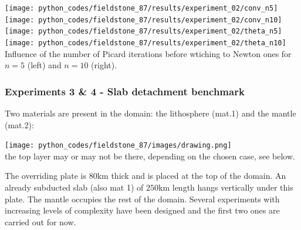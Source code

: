\begin{center}
\texttt{[image: python\_codes/fieldstone\_87/results/experiment\_02/conv\_n5]}
\texttt{[image: python\_codes/fieldstone\_87/results/experiment\_02/conv\_n10]}\\
\texttt{[image: python\_codes/fieldstone\_87/results/experiment\_02/theta\_n5]}
\texttt{[image: python\_codes/fieldstone\_87/results/experiment\_02/theta\_n10]}\\
{\captionfont Influence of the number of Picard iterations before wtiching to Newton ones
for $n=5$ (left) and $n=10$ (right).}
\end{center}





\newpage
\subsubsection*{Experiments 3 \& 4 - Slab detachment benchmark}

Two materials are present in the domain: the lithosphere (mat.1) and the mantle (mat.2):

\begin{center}
\texttt{[image: python\_codes/fieldstone\_87/images/drawing.png]}\\
{\captionfont the top layer may or may not be there, depending on the chosen case, see below.}
\end{center}

The overriding plate is $80\si{\kilo\metre}$ thick and is placed at the top of the domain. 
An already subducted slab (also mat 1) of $250\si{\kilo\metre}$ length hangs vertically under this plate.
The mantle occupies the rest of the domain.
Several experiments with increasing levels of complexity have been designed 
and the first two ones are carried out for now.

